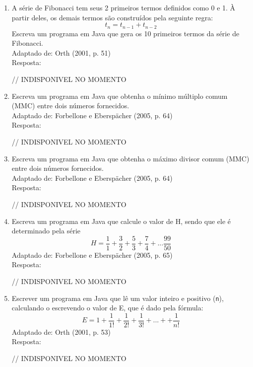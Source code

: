 \documentclass[onecolumn,a4paper,10pt]{report}
\newcommand{\+}{\, + \,}
\newcommand{\<}{\hspace*{-0.4cm}}
\begin{document}
\begin{enumerate}[1.]
\item A série de Fibonacci tem seus 2 primeiros termos definidos como 0 e 1. À partir deles, os demais termos são construídos pela seguinte regra:
\[ t_n = t_{n-1} + t_{n-2}\]
Escreva um programa em Java que gera os 10 primeiros termos da série de Fibonacci.\\
{\tiny Adaptado de: Orth (2001, p. 51)}\\
Resposta:\\
\begin{javacode}
// INDISPONIVEL NO MOMENTO
\end{javacode}

\item Escreva um programa em Java que obtenha o mínimo múltiplo comum (MMC) entre dois números fornecidos.\\
{\tiny Adaptado de: Forbellone e Eberspächer (2005, p. 64)}\\
Resposta:\\
\begin{javacode}
// INDISPONIVEL NO MOMENTO
\end{javacode}

\item Escreva um programa em Java que obtenha o máximo divisor comum (MMC) entre dois números fornecidos.\\
{\tiny Adaptado de: Forbellone e Eberspächer (2005, p. 64)}\\
Resposta:\\
\begin{javacode}
// INDISPONIVEL NO MOMENTO
\end{javacode}

\item Escreva um programa em Java que calcule o valor de H, sendo que ele é determinado pela série
\[ H = \frac{1}{1} + \frac{3}{2} + \frac{5}{3} + \frac{7}{4} + ... \frac{99}{50} \]
{\tiny Adaptado de: Forbellone e Eberspächer (2005, p. 65)}\\
Resposta:\\
\begin{javacode}
// INDISPONIVEL NO MOMENTO
\end{javacode}

\item Escrever um programa em Java que lê um valor inteiro e positivo (\texttt{n}), calculando o escrevendo o valor de E, que é dado pela fórmula:
\[ E = 1 + \frac{1}{1!} + \frac{1}{2!}+ \frac{1}{3!} + ... + + \frac{1}{n!}\]
{\tiny Adaptado de: Orth (2001, p. 53)}\\
Resposta:\\
\begin{javacode}
// INDISPONIVEL NO MOMENTO
\end{javacode}


\end{enumerate}
\end{document}
